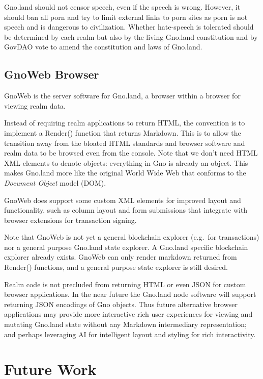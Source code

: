\documentclass[12pt,a4paper]{article}
\begin{document}
Gno.land should not censor speech, even if the speech is wrong. However,
it should ban all porn and try to limit external links to porn sites as
porn is not speech and is dangerous to civilization. Whether hate-speech
is tolerated should be determined by each realm but also by the living
Gno.land constitution and by GovDAO vote to amend the constitution and
laws of Gno.land.

\subsection{GnoWeb Browser}\label{gnoweb-browser}

GnoWeb is the server software for Gno.land, a browser within a browser
for viewing realm data.

Instead of requiring realm applications to return HTML, the convention
is to implement a Render() function that returns Markdown. This is to
allow the transition away from the bloated HTML standards and browser
software and realm data to be browsed even from the console. Note that
we don't need HTML XML elements to denote objects: everything in Gno is
already an object. This makes Gno.land more like the original World Wide
Web that conforms to the \emph{Document Object} model (DOM).

GnoWeb does support some custom XML elements for improved layout and
functionality, such as column layout and form submissions that integrate
with browser extensions for transaction signing.

Note that GnoWeb is not yet a general blockchain explorer (e.g.~for
transactions) nor a general purpose Gno.land state explorer. A Gno.land
specific blockchain explorer already exists. GnoWeb can only render
markdown returned from Render() functions, and a general purpose state
explorer is still desired.

Realm code is not precluded from returning HTML or even JSON for custom
browser applications. In the near future the Gno.land node software will
support returning JSON encodings of Gno objects. Thus future alternative
browser applications may provide more interactive rich user experiences
for viewing and mutating Gno.land state without any Markdown
intermediary representation; and perhaps leveraging AI for intelligent
layout and styling for rich interactivity.

\newpage

\section{Future Work}\label{future-work}
\end{document}
